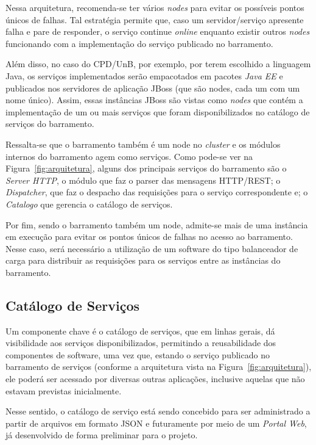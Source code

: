 Nessa arquitetura, recomenda-se ter vários \textit{nodes} para evitar os possíveis pontos únicos de falhas. Tal estratégia permite que, caso um servidor/serviço apresente falha e pare de responder, o serviço continue \textit{online} enquanto existir outros \textit{nodes} funcionando com a implementação do serviço publicado no barramento. 

Além disso, no caso do CPD/UnB, por exemplo, por terem escolhido a linguagem Java, os serviços implementados 
serão empacotados em pacotes \emph{Java EE} e publicados nos servidores de aplicação JBoss (que são nodes, cada um com um nome único).
Assim, essas instâncias JBoss são vistas como \textit{nodes} que contém a implementação de um ou mais serviços
que foram disponibilizados no catálogo de serviços do barramento.

Ressalta-se que o barramento também é um node no \textit{cluster} e os módulos 
internos do barramento agem como serviços. Como pode-se ver na Figura~\ref{fig:arquitetura}, alguns dos 
principais serviços do barramento são o \emph{Server HTTP}, o módulo que faz o parser das mensagens HTTP/REST; o \emph{Dispatcher}, que faz o despacho das requisições para o serviço correspondente e; o \emph{Catalogo} que gerencia o catálogo de serviços. 

Por fim, sendo o barramento também um node, admite-se mais de uma instância em execução para evitar os pontos únicos de falhas no acesso ao barramento. Nesse caso, será necessário a utilização de um software 
do tipo balanceador de carga para distribuir as requisições para os serviços
entre as instâncias do barramento.




\subsection{Catálogo de Serviços}\label{catalogo_serviços}

Um componente chave é o catálogo de serviços, 
que em linhas gerais, dá visibilidade aos serviços 
disponibilizados, permitindo a reusabilidade dos componentes de software, 
uma vez que, estando o serviço publicado no barramento de serviços (conforme
a arquitetura vista na Figura~\ref{fig:arquitetura}), ele poderá ser 
acessado por diversas outras aplicações, inclusive aquelas que não
estavam previstas inicialmente. 

Nesse sentido, o catálogo de serviço está sendo concebido para ser administrado a partir 
de arquivos em formato \acrshort{JSON} e futuramente por
meio de um \emph{Portal Web}, já desenvolvido 
de forma preliminar para o projeto. 


